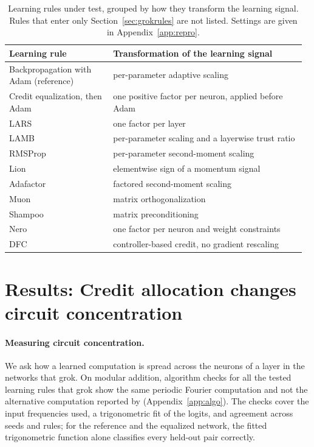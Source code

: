 \documentclass{article} %
\begin{document}
\begin{table}[t]
\caption{Learning rules under test, grouped by how they transform the learning signal. Rules that enter only Section~\ref{sec:grokrules} are not listed. Settings are given in Appendix~\ref{app:repro}.}
\label{tab:ruleset}
\begin{center}
\footnotesize
\setlength{\tabcolsep}{4pt}
\begin{tabular}{@{}p{0.34\linewidth}p{0.63\linewidth}@{}}
\toprule
Learning rule & Transformation of the learning signal \\
\midrule
Backpropagation with Adam (reference) & per-parameter adaptive scaling \citep{kingma2015adam} \\
Credit equalization, then Adam & one positive factor per neuron, applied before Adam \\
\midrule
LARS & one factor per layer \citep{you2017lars} \\
LAMB & per-parameter scaling and a layerwise trust ratio \citep{you2020lamb} \\
RMSProp & per-parameter second-moment scaling \citep{tieleman2012rmsprop} \\
Lion & elementwise sign of a momentum signal \citep{chen2023lion} \\
Adafactor & factored second-moment scaling \citep{shazeer2018adafactor} \\
Muon & matrix orthogonalization \citep{jordan2024muon} \\
Shampoo & matrix preconditioning \citep{gupta2018shampoo} \\
Nero & one factor per neuron and weight constraints \citep{liu2021nero} \\
\midrule
DFC & controller-based credit, no gradient rescaling \citep{meulemans2021dfc} \\
\bottomrule
\end{tabular}
\end{center}
\end{table}

\section{Results: Credit allocation changes circuit concentration}
\label{sec:select}

\paragraph{Measuring circuit concentration.} We ask how a learned computation is spread across the neurons of a layer in the networks that grok. On modular addition, algorithm checks for all the tested learning rules that grok show the same periodic Fourier computation and not the alternative computation reported by \citet{zhong2023clock} (Appendix~\ref{app:algo}). The checks cover the input frequencies used, a trigonometric fit of the logits, and agreement across seeds and rules; for the reference and the equalized network, the fitted trigonometric function alone classifies every held-out pair correctly.
\end{document}
